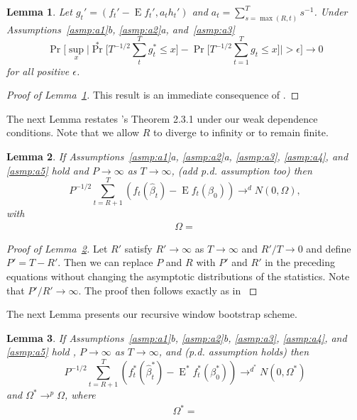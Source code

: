 \documentclass[12pt]{article}
\newcommand\citepos[2][]{\citeauthor{#2}'s \citeyearpar[#1]{#2}}
\newtheorem{lema}{Lemma}[section]
\theoremstyle{definition}
\DeclareMathOperator{\E}{E}
\DeclareMathOperator{\pr}{Pr}
\begin{document}
\begin{lema}\label{res:a3}
  Let $g_{t}' = (f_{t}' - \E f_{t}', a_t h_{t}')$ and $a_t =
  \sum_{s=\max(R,t)}^T s^{-1}$.  Under Assumptions~\ref{asmp:a1}b,
  \ref{asmp:a2}a, and~\ref{asmp:a3}
  \begin{equation}
    \pr\Big[\sup_x \Big| \pr^{*}\Big[ T^{-1/2} \sum_t^T g_{t}^{*}
    \leq x \Big] - \pr\Big[ T^{-1/2} \sum_{t=1}^T g_{t}
    \leq x \Big] \Big| > \epsilon \Big] \to 0
  \end{equation}
  for all positive $\epsilon$.
\end{lema}

\begin{proof}[Proof of Lemma~\ref{res:a3}]
  This result is an immediate consequence of \citet[Theorem 2]{GoJ:03}.
\end{proof}

The next Lemma restates \citepos{Mcc:00} Theorem 2.3.1 under our weak
dependence conditions.  Note that we allow $R$ to diverge to infinity
or to remain finite.

\begin{lema}\label{res:a5}
  If Assumptions~\ref{asmp:a1}a, \ref{asmp:a2}a, \ref{asmp:a3},
  \ref{asmp:a4}, and \ref{asmp:a5} hold and $P \to \infty$ as $T \to
  \infty$, (add p.d. assumption too) then
  \begin{equation}
    P^{-1/2} \sum_{t=R+1}^T
    (f_{t}(\hat{\beta}_{t}) - \E f_{t}(\beta_{0})) \to^d N(0, \Omega),
  \end{equation}
  with
  \begin{align}
    \Omega =     
  \end{align}
\end{lema}
\begin{proof}[Proof of Lemma~\ref{res:a5}]
  Let $R'$ satisfy $R' \to \infty$ as $T \to \infty$ and $R'/T \to 0$
  and define $P' = T - R'$.  Then we can replace $P$ and $R$ with $P'$
  and $R'$ in the preceding equations without changing the asymptotic
  distributions of the statistics.  Note that $P'/R' \to \infty$.  The
  proof then follows exactly as in \citet[Theorem 2.3.1]{Mcc:00}
\end{proof}

The next Lemma presents our recursive window bootstrap scheme.
\begin{lema}\label{res:a6}
  If Assumptions~\ref{asmp:a1}b, \ref{asmp:a2}b, \ref{asmp:a3},
  \ref{asmp:a4}, and \ref{asmp:a5} hold , $P \to \infty$ as $T \to
  \infty$, and (p.d. assumption holds) then
  \begin{equation}
    P^{-1/2} \sum_{t=R+1}^T
    (f_{t}^{*}(\hat{\beta}_{t}^{*}) - \E^{*} f^{*}_{t}(\beta_{0}^{*})) \to^{d^{*}} N(0, \Omega^{*})
  \end{equation}
  and $\Omega^{*} \to^p \Omega$, where
  \begin{align}
    \Omega^{*} =     
  \end{align}
\end{lema}
\end{document}

